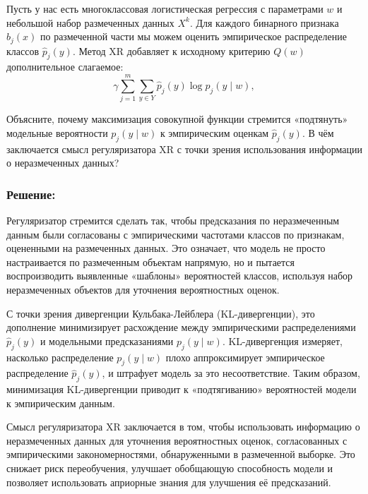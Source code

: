 Пусть у нас есть многоклассовая логистическая регрессия с параметрами $w$ и небольшой набор размеченных данных $X^k$. Для каждого бинарного признака $b_j(x)$ по размеченной части мы можем оценить эмпирическое распределение классов $\hat{p}_j(y)$. Метод XR добавляет к исходному критерию $Q(w)$ дополнительное слагаемое:
\[
\gamma \sum_{j=1}^m \sum_{y \in Y} \hat{p}_j(y) \log p_j(y \mid w),
\]

Объясните, почему максимизация совокупной функции стремится «подтянуть» модельные вероятности $p_j(y \mid w)$ к эмпирическим оценкам $\hat{p}_j(y)$. В чём заключается смысл регуляризатора XR с точки зрения использования информации о неразмеченных данных?

\subsubsection*{Решение:} 
Регуляризатор стремится сделать так, чтобы предсказания по неразмеченным данным были согласованы с эмпирическими частотами классов по признакам, оцененными на размеченных данных. Это означает, что модель не просто настраивается по размеченным объектам напрямую, но и пытается воспроизводить выявленные «шаблоны» вероятностей классов, используя набор неразмеченных объектов для уточнения вероятностных оценок. 

С точки зрения дивергенции Кульбака-Лейблера (KL-дивергенции), это дополнение минимизирует расхождение между эмпирическими распределениями $\hat{p}_j(y)$ и модельными предсказаниями $p_j(y \mid w)$. KL-дивергенция измеряет, насколько распределение $p_j(y \mid w)$ плохо аппроксимирует эмпирическое распределение $\hat{p}_j(y)$, и штрафует модель за это несоответствие. Таким образом, минимизация KL-дивергенции приводит к «подтягиванию» вероятностей модели к эмпирическим данным.

Смысл регуляризатора XR заключается в том, чтобы использовать информацию о неразмеченных данных для уточнения вероятностных оценок, согласованных с эмпирическими закономерностями, обнаруженными в размеченной выборке. Это снижает риск переобучения, улучшает обобщающую способность модели и позволяет использовать априорные знания для улучшения её предсказаний.

